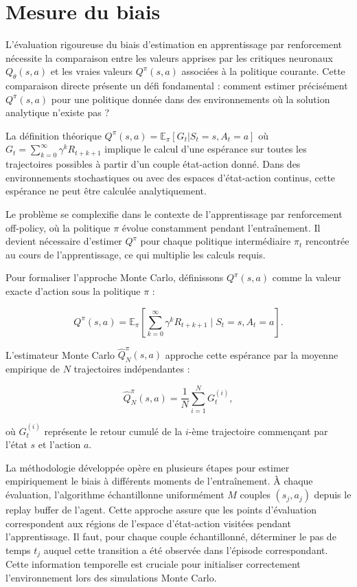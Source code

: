 \documentclass[a4paper, 12pt]{report}
\begin{document}
    \section{Mesure du biais}

    L'évaluation rigoureuse du biais d'estimation en apprentissage par
    renforcement nécessite la comparaison entre les valeurs apprises par les
    critiques neuronaux $Q_\theta(s,a)$ et les vraies valeurs $Q^\pi(s,a)$
    associées à la politique courante. Cette comparaison directe présente un
    défi fondamental : comment estimer précisément $Q^\pi(s,a)$ pour une
    politique donnée dans des environnements où la solution analytique n'existe
    pas ?

    La définition théorique $Q^\pi(s,a) = \mathbb{E}_\pi[G_t | S_t = s, A_t =
    a]$ où $G_t = \sum_{k=0}^{\infty} \gamma^k R_{t+k+1}$ implique le calcul
    d'une espérance sur toutes les trajectoires possibles à partir d'un couple
    état-action donné. Dans des environnements stochastiques ou avec des
    espaces d'état-action continus, cette espérance ne peut être calculée
    analytiquement.

    Le problème se complexifie dans le contexte de l'apprentissage par
    renforcement off-policy, où la politique $\pi$ évolue constamment pendant
    l'entraînement. Il devient nécessaire d'estimer $Q^\pi$ pour chaque
    politique intermédiaire $\pi_t$ rencontrée au cours de l'apprentissage, ce
    qui multiplie les calculs requis.

    Pour formaliser l'approche Monte Carlo, définissons $Q^\pi(s,a)$ comme la
    valeur exacte d'action sous la politique $\pi$ :

    $$
    Q^\pi(s,a) = \mathbb{E}_\pi\left[\sum_{k=0}^{\infty} \gamma^k R_{t+k+1} \mid S_t = s, A_t = a\right].
    $$

    L'estimateur Monte Carlo $\hat{Q}^\pi_N(s,a)$ approche cette espérance par
    la moyenne empirique de $N$ trajectoires indépendantes :

    $$
    \hat{Q}^\pi_N(s,a) = \frac{1}{N} \sum_{i=1}^{N} G^{(i)}_t,
    $$

    où $G^{(i)}_t$ représente le retour cumulé de la $i$-ème trajectoire commençant par l'état $s$ et l'action $a$.

    La méthodologie développée opère en plusieurs étapes pour estimer
    empiriquement le biais à différents moments de l'entraînement. À chaque
    évaluation, l'algorithme échantillonne uniformément $M$ couples $(s_j,
    a_j)$ depuis le replay buffer de l'agent. Cette approche assure que les
    points d'évaluation correspondent aux régions de l'espace d'état-action
    visitées pendant l'apprentissage. Il faut, pour chaque couple
    échantillonné, déterminer le pas de temps $t_j$ auquel cette transition a
    été observée dans l'épisode correspondant. Cette information temporelle est
    cruciale pour initialiser correctement l'environnement lors des simulations
    Monte Carlo.
\end{document}
